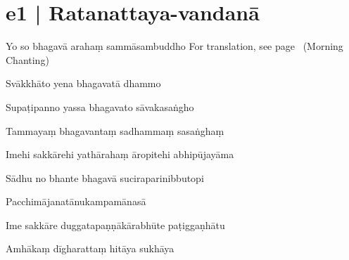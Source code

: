 
\section*{e1 | Ratanattaya-vandanā}

\begin{chantsubsection}
  \chantline
    {Yo so bhagavā arahaṃ sammāsambuddho}
    {For translation, see page~\pageref{sec:m01} (Morning Chanting)}

  \chantonly
    {Svākkhāto yena bhagavatā dhammo}

  \chantonly
    {Supaṭipanno yassa bhagavato sāvakasaṅgho}

  \chantonly
    {Tammayaṃ bhagavantaṃ sadhammaṃ sasaṅghaṃ}

  \chantonly
    {Imehi sakkārehi yathārahaṃ āropitehi abhipūjayāma}

  \chantonly
    {Sādhu no bhante bhagavā suciraparinibbutopi}

  \chantonly
    {Pacchimājanatānukampamānasā}

  \chantonly
    {Ime sakkāre duggatapaṇṇākārabhūte paṭiggaṇhātu}

  \chantonly
    {Amhākaṃ dīgharattaṃ hitāya sukhāya}
\end{chantsubsection}
